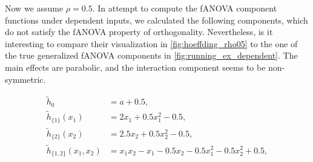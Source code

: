 Now we assume $\rho = 0.5$. In attempt to compute the fANOVA component functions under dependent inputs, we calculated the following components, which do not satisfy the fANOVA property of orthogonality. Nevertheless, is it interesting to compare their visualization in \autoref{fig:hoeffding_rho05} to the one of the true generalized fANOVA components in \autoref{fig:running_ex_dependent}.
The main effects are parabolic, and the interaction component seems to be non-symmetric.

\begin{align*}
\tilde{h}_0 &= a + 0.5, \\[3pt]
\tilde{h}_{\{1\}}(x_1) &= 2x_1 + 0.5x_1^2 - 0.5, \\[3pt]
\tilde{h}_{\{2\}}(x_2) &= 2.5x_2 + 0.5x_2^2 - 0.5, \\[3pt]
\tilde{h}_{\{1,2\}}(x_1,x_2) &= x_1x_2 - x_1 - 0.5x_2 - 0.5x_1^2 - 0.5x_2^2 + 0.5,
\end{align*}

